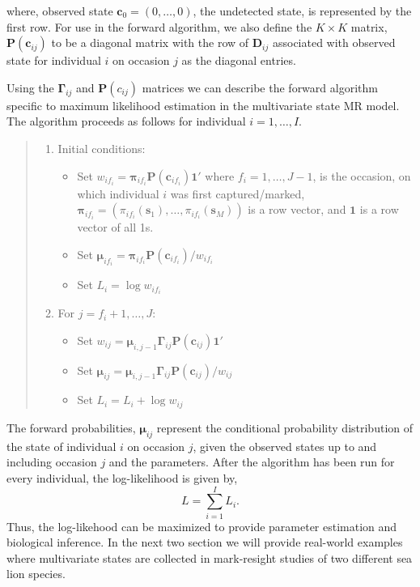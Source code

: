 \documentclass[fleqn]{article}
\newcommand{\bs}{\ensuremath{\mathbf{s}}}
\newcommand{\bc}{\ensuremath{\mathbf{c}}}
\newcommand{\bG}{\ensuremath{\boldsymbol{\Gamma}}}
\newcommand{\bD}{\ensuremath{\mathbf{D}}}
\newcommand{\bP}{\ensuremath{\mathbf{P}}}
\begin{document}
where, observed state $\bc_0 = (0,\dots,0)$, the undetected state, is represented by the first row.
For use in the forward algorithm, we also define the $K\times K$ matrix, $\bP(\bc_{ij})$ to be a diagonal matrix with the row of $\bD_{ij}$ associated with observed state for individual $i$ on occasion $j$ as the diagonal entries.

Using the $\bG_{ij}$ and $\bP(c_{ij})$ matrices we can describe the forward algorithm specific to maximum likelihood estimation in the multivariate state MR model. The algorithm proceeds as follows for individual $i=1,\dots,I$.
\begin{quote}
\begin{enumerate}
\item Initial conditions:
\begin{itemize}
\item Set $w_{if_i} = \boldsymbol{\pi}_{if_i}\bP(\bc_{if_i})\mathbf{1}'$ where $f_i=1,\dots,J-1$, is the occasion, on which individual $i$ was first captured/marked, $\boldsymbol{\pi}_{if_i} = (\pi_{if_i}(\bs_1),\dots,\pi_{if_i}(\bs_M))$ is a row vector, and $\mathbf{1}$ is a row vector of all 1s.
\item Set $\boldsymbol{\mu}_{if_i} = \boldsymbol{\pi}_{if_i}\bP(\bc_{if_i})/w_{if_i}$
\item Set $L_{i} = \log w_{if_i}$
\end{itemize}
\item For $j=f_i+1,\dots,J$:
\begin{itemize}
\item Set $w_{ij} = \boldsymbol{\mu}_{i,j-1}\bG_{ij}\bP(\bc_{ij})\mathbf{1}'$
\item Set $\boldsymbol{\mu}_{ij} = \boldsymbol{\mu}_{i,j-1}\bG_{ij}\bP(\bc_{ij})/w_{ij}$
\item Set $L_i = L_i + \log w_{ij}$
\end{itemize}
\end{enumerate}
\end{quote}
The forward probabilities, $\boldsymbol{\mu}_{ij}$ represent the conditional probability distribution of the state of individual $i$ on occasion $j$, given the observed states up to and including occasion $j$ and the parameters. After the algorithm has been run for every individual, the log-likelihood is given by,
\begin{equation}
L = \sum_{i=1}^I L_i.
\end{equation}
Thus, the log-likehood can be maximized to provide parameter estimation and biological inference. In the next two section we will provide real-world examples where multivariate states are collected in mark-resight studies of two different sea lion species.  
\end{document}
